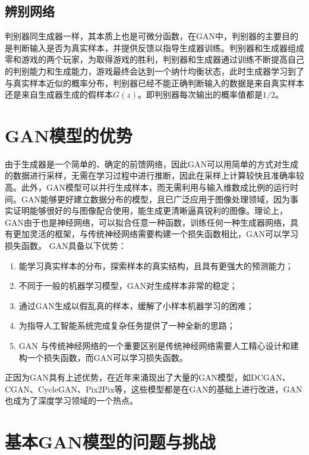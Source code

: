 \documentclass[lang=cn,a4paper,12pt,bibend=biber]{GAN}
\begin{document}
\subsection{辨别网络}

判别器同生成器一样，其本质上也是可微分函数，在GAN中，判别器的主要目的是判断输入是否为真实样本，并提供反馈以指导生成器训练。判别器和生成器组成零和游戏的两个玩家，为取得游戏的胜利，判别器和生成器通过训练不断提高自己的判别能力和生成能力，游戏最终会达到一个纳什均衡状态，此时生成器学习到了与真实样本近似的概率分布，判别器已经不能正确判断输入的数据是来自真实样本还是来自生成器生成的假样本$G(z)$。即判别器每次输出的概率值都是$1/2$。

\section{GAN模型的优势}

由于生成器是一个简单的、确定的前馈网络，因此GAN可以用简单的方式对生成的数据进行采样，无需在学习过程中进行推断，因此在采样上计算较快且准确率较高。此外，GAN模型可以并行生成样本，而无需利用与输入维数成比例的运行时间。GAN能够更好建立数据分布的模型，且已广泛应用于图像处理领域，因为事实证明能够很好的与图像配合使用，能生成更清晰逼真锐利的图像。理论上，GAN由于也是神经网络，可以拟合任意一种函数，训练任何一种生成器网络，具有更加灵活的框架，与传统神经网络需要构建一个损失函数相比，GAN可以学习损失函数。
GAN具备以下优势：
\begin{enumerate}[label=\arabic*).]
  \item 能学习真实样本的分布，探索样本的真实结构，且具有更强大的预测能力；
  \item 不同于一般的机器学习模型，GAN对生成样本非常的稳定；
  \item 通过GAN生成以假乱真的样本，缓解了小样本机器学习的困难；
  \item 为指导人工智能系统完成复杂任务提供了一种全新的思路；
  \item GAN 与传统神经网络的一个重要区别是传统神经网络需要人工精心设计和建构一个损失函数，而GAN可以学习损失函数。
\end{enumerate}

正因为GAN具有上述优势，在近年来涌现出了大量的GAN模型，如DCGAN、CGAN、CycleGAN、Pix2Pix等，这些模型都是在GAN的基础上进行改进，GAN也成为了深度学习领域的一个热点。

\section{基本GAN模型的问题与挑战}
\end{document}
